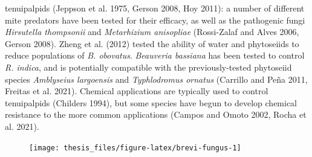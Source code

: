 \documentclass[12pt,final,CPage]{ufthesis}
\begin{document}
{tenuipalpids (Jeppson et al. 1975, Gerson 2008, Hoy 2011): a number of different mite predators have been tested for their efficacy, as well as the pathogenic fungi \emph{Hirsutella thompsonii} and \emph{Metarhizium anisopliae} (Rossi-Zalaf and Alves 2006, Gerson 2008). Zheng et al. (2012) tested the ability of water and phytoseiids to reduce populations of \emph{B. obovatus}. \emph{Beauveria bassiana} has been tested to control \emph{R. indica}, and is potentially compatible with the previously-tested phytoseiid species \emph{Amblyseius largoensis} and \emph{Typhlodromus ornatus} (Carrillo and Peña 2011, Freitas et al. 2021). Chemical applications are typically used to control tenuipalpids (Childers 1994), but some species have begun to develop chemical resistance to the more common applications (Campos and Omoto 2002, Rocha et al. 2021).
  \begin{figure}

  {\centering \texttt{[image: thesis\_files/figure-latex/brevi-fungus-1]} 

  }


\end{figure}}
\end{document}
